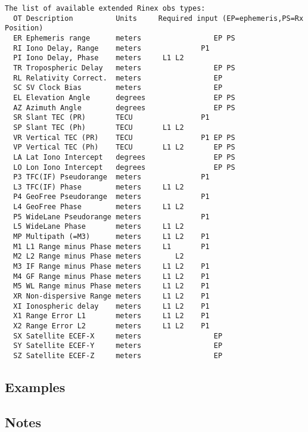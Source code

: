\begin{\outputsize}
\begin{verbatim}
The list of available extended Rinex obs types:
  OT Description          Units     Required input (EP=ephemeris,PS=Rx Position)
  ER Ephemeris range      meters                 EP PS
  RI Iono Delay, Range    meters              P1
  PI Iono Delay, Phase    meters     L1 L2
  TR Tropospheric Delay   meters                 EP PS
  RL Relativity Correct.  meters                 EP
  SC SV Clock Bias        meters                 EP
  EL Elevation Angle      degrees                EP PS
  AZ Azimuth Angle        degrees                EP PS
  SR Slant TEC (PR)       TECU                P1
  SP Slant TEC (Ph)       TECU       L1 L2
  VR Vertical TEC (PR)    TECU                P1 EP PS
  VP Vertical TEC (Ph)    TECU       L1 L2       EP PS
  LA Lat Iono Intercept   degrees                EP PS
  LO Lon Iono Intercept   degrees                EP PS
  P3 TFC(IF) Pseudorange  meters              P1
  L3 TFC(IF) Phase        meters     L1 L2
  P4 GeoFree Pseudorange  meters              P1
  L4 GeoFree Phase        meters     L1 L2
  P5 WideLane Pseudorange meters              P1
  L5 WideLane Phase       meters     L1 L2
  MP Multipath (=M3)      meters     L1 L2    P1
  M1 L1 Range minus Phase meters     L1       P1
  M2 L2 Range minus Phase meters        L2
  M3 IF Range minus Phase meters     L1 L2    P1
  M4 GF Range minus Phase meters     L1 L2    P1
  M5 WL Range minus Phase meters     L1 L2    P1
  XR Non-dispersive Range meters     L1 L2    P1
  XI Ionospheric delay    meters     L1 L2    P1
  X1 Range Error L1       meters     L1 L2    P1
  X2 Range Error L2       meters     L1 L2    P1
  SX Satellite ECEF-X     meters                 EP
  SY Satellite ECEF-Y     meters                 EP
  SZ Satellite ECEF-Z     meters                 EP
\end{verbatim}

\end{\outputsize}

\subsection{Examples}

\subsection{Notes}

%
